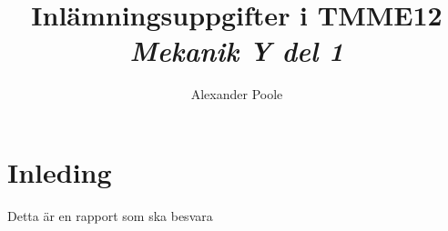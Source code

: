 \documentclass[a4paper,12pt]{article}
\title{Inlämningsuppgifter i TMME12\\ \emph{Mekanik Y del 1}}
\author{Alexander Poole}
\begin{document}


\section{Inleding}
Detta är en rapport som ska besvara
\end{document}
